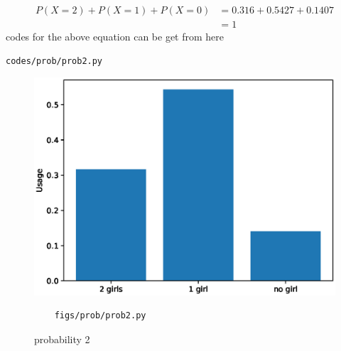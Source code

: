 \begin{enumerate}[label=\arabic*.,ref=\thesubsection.\theenumi]
\begin{align}
P(X=2) + P(X=1) + P(X=0) &= 0.316 + 0.5427 + 0.1407
\\
&= 1
\end{align}
codes for the above equation can be get from here
\begin{lstlisting}
codes/prob/prob2.py
\end{lstlisting}
\begin{figure}[!ht]
	\centering
	\includegraphics[width=\columnwidth]{./figures/prob/prob2.eps}
	\caption{probability 2 }
	\label{fig:bt2}
	\begin{lstlisting}
	figs/prob/prob2.py
	\end{lstlisting}
\end{figure}
\end{enumerate}